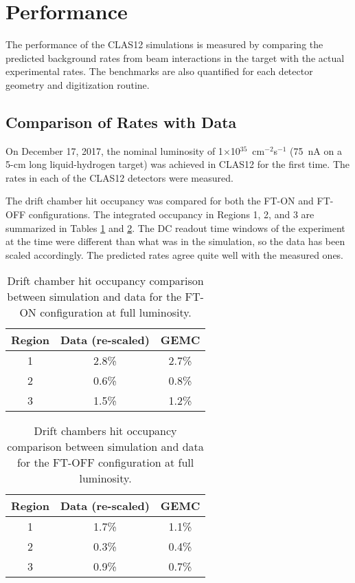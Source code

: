 \section{Performance}

The performance of the CLAS12 simulations is measured by comparing the predicted background rates from beam
interactions in the target with the actual experimental rates. The benchmarks are also quantified for each detector
geometry and digitization routine.

\subsection{Comparison of Rates with Data}

On December 17, 2017, the nominal luminosity of 1$\times$10$^{35}$~cm$^{-2}$s$^{-1}$ (75~nA on a 5-cm long
liquid-hydrogen target) was achieved in CLAS12 for the first time. The rates in each of the CLAS12 detectors were
measured.

The drift chamber hit occupancy was compared for both the FT-ON and FT-OFF configurations. The integrated occupancy
in Regions 1, 2, and 3 are summarized in Tables \ref{tab:ftOnComparison} and \ref{tab:ftOffComparison}. The DC
readout time windows of the experiment at the time were different than what was in the simulation, so the data has
been scaled accordingly. The predicted rates agree quite well with the measured ones.

\begin{table}[h]
	\begin{center}
		\begin{tabular}{| c | c | c |}
			\hline \hline
			Region & Data (re-scaled) &  GEMC \\
			\hline
			1 &  2.8\%  & 2.7\% \\
			2 &  0.6\%  & 0.8\% \\
			3 &  1.5\%  & 1.2\% \\
		\hline \hline
		\end{tabular}
	\end{center}
	\caption{Drift chamber hit occupancy comparison between simulation and data for the FT-ON configuration at full
          luminosity.}
        \label{tab:ftOnComparison}
\end{table}

\begin{table}[h]
	\begin{center}
		\begin{tabular}{| c | c | c |}
			\hline \hline
			Region & Data (re-scaled) &  GEMC \\
			\hline
			1 &  1.7\%  & 1.1\% \\
			2 &  0.3\%  & 0.4\% \\
			3 &  0.9\%  & 0.7\% \\
		\hline \hline
		\end{tabular}
	\end{center}
	\caption{Drift chambers hit occupancy comparison between simulation and data for the FT-OFF configuration at full
          luminosity.}
        \label{tab:ftOffComparison}
\end{table}

